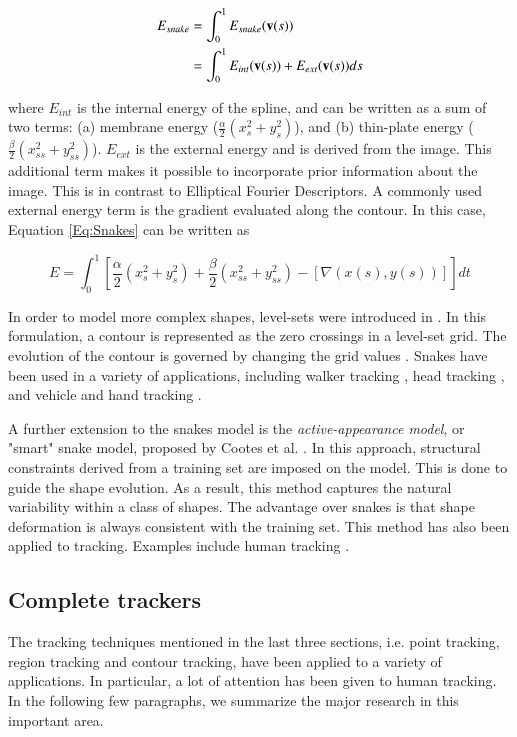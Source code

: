 \begin{Body}
\begin{align}
E_{snake} &= \int_0^1 E_{snake}(\mathbf{v}(s)) \notag\\
&=\int_0^1 E_{int}(\mathbf{v}(s)) + E_{ext}(\mathbf{v}(s)) ds
\label{Eq:Snakes}
\end{align}

where $E_{int}$ is the internal energy of the spline, and can be written as a sum of two terms: (a) membrane energy ($\frac{\alpha}{2}(x_s^2 + y_s^2)$), and (b) thin-plate energy ($\frac{\beta}{2}(x_{ss}^2 + y_{ss}^2)$).  $E_{ext}$ is the external energy and is derived from the image.  This additional term makes it possible to incorporate prior information about the image.  This is in contrast to Elliptical Fourier Descriptors.  A commonly used external energy term is the gradient evaluated along the contour.  In this case, Equation \ref{Eq:Snakes} can be written as

\begin{equation}
	\label{eq:SnakesEnergy1}
	E=\int_0^1 \left[\frac{\alpha}{2}(x_s^2 + y_s^2) + \frac{\beta}{2}(x_{ss}^2 + y_{ss}^2) - \left[\nabla{(x(s), y(s))}\right]\right]dt
\end{equation}

In order to model more complex shapes, level-sets were introduced in \cite{1995_JNL_LevelSets_Malladi}.  In this formulation, a contour is represented as the zero crossings in a level-set grid.  The evolution of the contour is governed by changing the grid values \cite{2006_JNL_SURVEYtrk_Yilmaz}.  Snakes have been used in a variety of applications, including walker tracking \cite{1994_CNF_WalkingFiguresXYT_Niyogi}, head tracking \cite{2001_JNL_ProbabilisticDataAssociation_Rasmussen}, and vehicle and hand tracking \cite{1999_JNL_KalmanSnakes_Peterfreund}.

A further extension to the snakes model is the \emph{active-appearance model}, or "smart" snake model, proposed by Cootes et al. \cite{1995_JNL_ActiveModels_Cootes}.  In this approach, structural constraints derived from a training set are imposed on the model.  This is done to guide the shape evolution.  As a result, this method captures the natural variability within a class of shapes.  The advantage over snakes is that shape deformation is always consistent with the training set.  This method has also been applied to tracking.  Examples include human tracking \cite{1994_CNF_ContourTracking_BaumbergHogg, 2003_JNL_ActiveShapeTracking_Koschan}.


\subsection{Complete trackers}
The tracking techniques mentioned in the last three sections, i.e. point tracking, region tracking and contour tracking, have been applied to a variety of applications.  In particular, a lot of attention has been given to human tracking.  In the following few paragraphs, we summarize the major research in this important area.



\end{Body}

